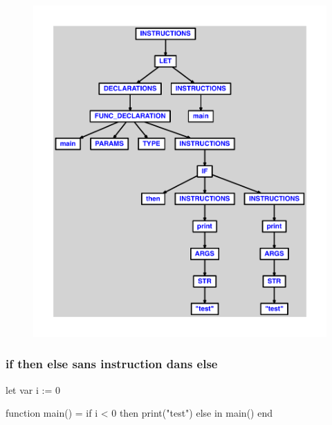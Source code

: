 \documentclass{article}
\begin{document}
\begin{figure}[H]\centering\includegraphics[max width=\textwidth]{ast/ast_245.pdf}\end{figure}\subsubsection{if then else sans instruction dans else}
\begin{verbatimtab}
let
	var i := 0

	function main() =
		if i < 0 then
			print("test")
		else
in main() end
\end{verbatimtab}
\end{document}
